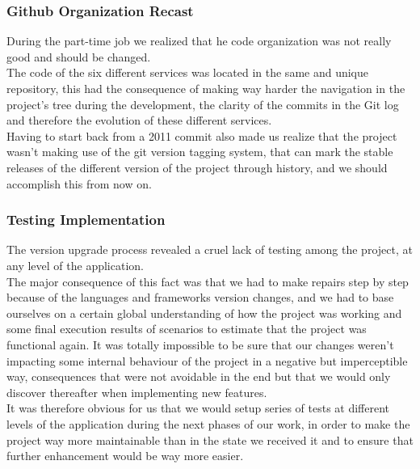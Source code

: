 \documentclass{eplmastersthesis}
\begin{document}
        \subsubsection{Github Organization Recast}

          During the part-time job we realized that he code organization
          was not really good and should be changed.\\
          The code of the six different services was located in the same and
          unique repository, this had the consequence of making way harder
          the navigation in the project's tree during the development, the
          clarity of the commits in the Git log and therefore the evolution
          of these different services.\\

          Having to start back from a 2011 commit also made us realize that the
          project wasn't making use of the git version tagging system, that
          can mark the stable releases of the different version of the project
          through history, and we should accomplish this from now on.

        \subsubsection{Testing Implementation}

          The version upgrade process revealed a cruel lack of testing among
          the project, at any level of the application.\\
          The major consequence of this fact was that we had to make repairs
          step by step because of the languages and frameworks version changes,
          and we had to base ourselves on a certain global understanding of how
          the project was working and some final execution results of scenarios
          to estimate that the project was functional again. It was totally
          impossible to be sure that our changes weren't impacting some internal
          behaviour of the project in a negative but imperceptible way,
          consequences that were not avoidable in the end but that we would
          only discover thereafter when implementing new features.\\
          It was therefore obvious for us that we would setup series of tests
          at different levels of the application during the next phases of our
          work, in order to make the project way more maintainable than in the
          state we received it and to ensure that further enhancement would
          be way more easier.\\
\end{document}
